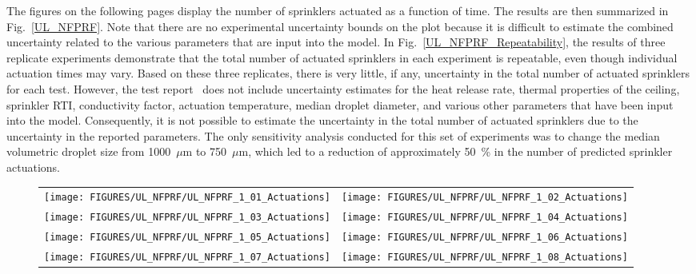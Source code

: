 The figures on the following pages display the number of sprinklers actuated as a function of time.
The results are then summarized in Fig.~\ref{UL_NFPRF}. Note that there are no experimental uncertainty bounds on the plot because it is difficult to estimate the
combined uncertainty related to the various parameters that are input into the model. In Fig.~\ref{UL_NFPRF_Repeatability}, the results of three replicate experiments
demonstrate that the total number of actuated sprinklers in each experiment is repeatable, even though individual actuation times may vary. Based on these
three replicates, there is very little, if any, uncertainty in the total number of actuated sprinklers for each test. However, the test report~\cite{Sheppard:1} does not
include uncertainty estimates for the heat release rate, thermal properties of the ceiling, sprinkler RTI, conductivity factor, actuation temperature,
median droplet diameter, and various other parameters that have been input into the model. Consequently, it is not possible to estimate the uncertainty in the
total number of actuated sprinklers due to the uncertainty in the reported parameters. The only sensitivity analysis conducted for this set of experiments was
to change the median volumetric droplet size from 1000~$\mu$m to 750~$\mu$m, which led to a reduction of approximately 50~\% in the number of predicted sprinkler actuations.


\begin{figure}[p]
\begin{tabular*}{\textwidth}{l@{\extracolsep{\fill}}r}
\texttt{[image: FIGURES/UL\_NFPRF/UL\_NFPRF\_1\_01\_Actuations]} &
\texttt{[image: FIGURES/UL\_NFPRF/UL\_NFPRF\_1\_02\_Actuations]} \\
\texttt{[image: FIGURES/UL\_NFPRF/UL\_NFPRF\_1\_03\_Actuations]} &
\texttt{[image: FIGURES/UL\_NFPRF/UL\_NFPRF\_1\_04\_Actuations]} \\
\texttt{[image: FIGURES/UL\_NFPRF/UL\_NFPRF\_1\_05\_Actuations]} &
\texttt{[image: FIGURES/UL\_NFPRF/UL\_NFPRF\_1\_06\_Actuations]} \\
\texttt{[image: FIGURES/UL\_NFPRF/UL\_NFPRF\_1\_07\_Actuations]} &
\texttt{[image: FIGURES/UL\_NFPRF/UL\_NFPRF\_1\_08\_Actuations]} \\
\end{tabular*}
\label{UL_NFPRF_1}
\end{figure}


